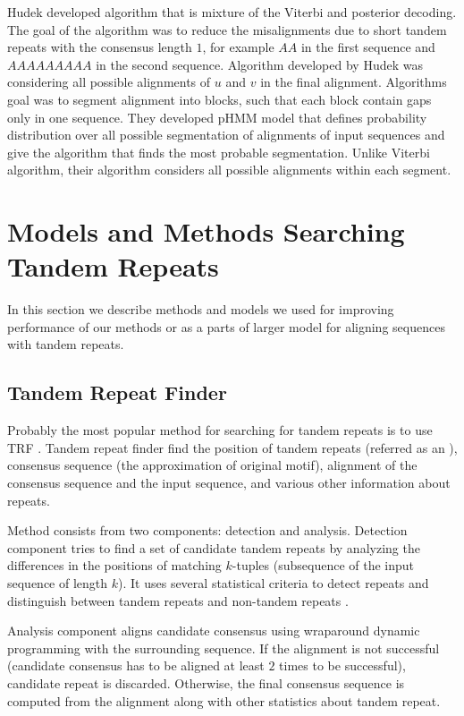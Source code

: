 Hudek \cite{Hudek2010} developed algorithm that is mixture of the Viterbi and
posterior decoding. The goal of the algorithm was to reduce the misalignments
due to short tandem repeats with the consensus length $1$, for example $AA$
in the first sequence and $AAAAAAAAA$ in the second sequence. Algorithm
developed by Hudek was considering all possible alignments of $u$ and $v$ in
the final alignment. Algorithms goal was to segment alignment into blocks, such
that each block contain gaps only in one sequence. They developed pHMM model
that defines probability distribution over all possible segmentation of
alignments of input sequences and give the algorithm that finds the most
probable segmentation.  Unlike Viterbi algorithm, their algorithm considers all
possible alignments within each segment.

\section{Models and Methods Searching Tandem Repeats}

In this section we describe methods and models we used for improving
performance of our methods or as a parts of larger model for aligning sequences
with tandem repeats. 

\subsection{Tandem Repeat Finder}

Probably the most popular method for searching for tandem repeats is to use TRF
\cite{Benson1999}.  Tandem repeat finder find the position of tandem repeats
(referred as an ), consensus sequence (the approximation
of original motif), alignment of the consensus sequence and the input sequence,
and various other information about repeats.

Method consists from two components: detection and analysis. Detection
component tries to find a set of candidate tandem repeats by analyzing the
differences in the positions of matching $k$-tuples (subsequence of the input
sequence of length $k$). It uses several statistical criteria to detect repeats
and distinguish between tandem repeats and non-tandem repeats
\cite{Benson1999}.

Analysis component aligns candidate consensus using wraparound dynamic
programming \cite{Myers1989} with the surrounding sequence. If the alignment is
not successful (candidate consensus has to be aligned at least $2$ times to be
successful), candidate repeat is discarded. Otherwise, the final consensus
sequence is computed from the alignment along with other statistics about
tandem repeat.

